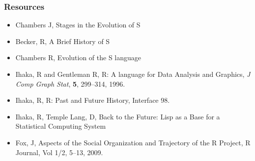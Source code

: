 \documentclass[svgnames]{beamer}
\begin{document}
\begin{frame}
  \frametitle{Resources}

  \begin{itemize}
  \item Chambers J, Stages in the Evolution of S
  \item Becker, R, A Brief History of S
  \item Chambers R, Evolution of the S language
  \item Ihaka, R and Gentleman R, R: A language for Data Analysis and Graphics,
    {\em J Comp Graph Stat}, {\bf 5}, 299--314, 1996.
  \item Ihaka, R, R: Past and Future History, Interface 98.
  \item Ihaka, R, Temple Lang, D, Back to the Future: Lisp as a Base for a
    Statistical Computing System
  \item Fox, J, Aspects of the Social Organization and Trajectory of
    the R Project, R Journal, Vol 1/2, 5--13, 2009.
  \end{itemize}

\end{frame}
\end{document}
